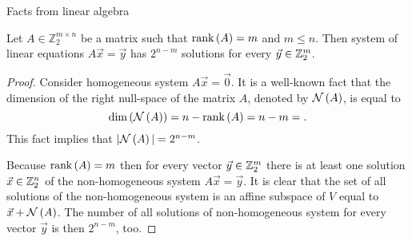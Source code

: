 \begin{chapter}{Facts from linear algebra}
\begin{lemma}
\label{lemma-system-of-linear-equations-solution-count}
Let $A \in \mathbb{Z}_2^{m \times n}$ be a matrix such that $\mathrm{rank}\left({A}\right) = m$ and $m \leq n$. Then system of linear equations $A\vec{x} = \vec{y}$ has $2 ^ {n - m}$ solutions for every $\vec{y} \in \mathbb{Z}_{2}^{m}$.
\end{lemma}
\begin{proof}
Consider homogeneous system $A\vec{x} = \vec{0}$. It is a well-known fact that the dimension of the right null-space of the matrix $A$, denoted by $\mathcal{N}\left({A}\right)$, is equal to \[ \mathrm{dim}\left({\mathcal{N}\left({A}\right)}\right) =n - \mathrm{rank}\left({A}\right) = n - m = \text{.} \] This fact implies that $|\mathcal{N}\left({A}\right)| = 2 ^ {n - m}$.

Because $\mathrm{rank}\left({A}\right) = m$ then for every vector $\vec{y} \in \mathbb{Z}_{2}^{m}$ there is at least one solution $\vec{x} \in \mathbb{Z}_{2}^{n}$ of the non-homogeneous system $A\vec{x} = \vec{y}$. It is clear that the set of all solutions of the non-homogeneous system is an affine subspace of $V$ equal to $\vec{x} + \mathcal{N}\left({A}\right)$. The number of all solutions of non-homogeneous system for every vector $\vec{y}$ is then $2 ^ {n - m}$, too.
\end{proof}
\end{chapter}
